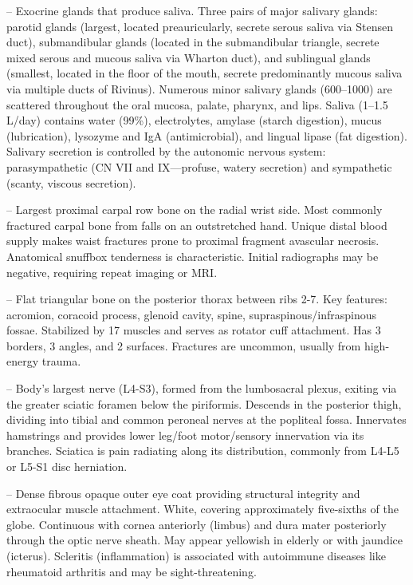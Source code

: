 -- Exocrine glands that produce saliva. Three pairs of major salivary glands: parotid glands (largest, located preauricularly, secrete serous saliva via Stensen duct), submandibular glands (located in the submandibular triangle, secrete mixed serous and mucous saliva via Wharton duct), and sublingual glands (smallest, located in the floor of the mouth, secrete predominantly mucous saliva via multiple ducts of Rivinus). Numerous minor salivary glands (600--1000) are scattered throughout the oral mucosa, palate, pharynx, and lips. Saliva (1--1.5 L/day) contains water (99\%), electrolytes, amylase (starch digestion), mucus (lubrication), lysozyme and IgA (antimicrobial), and lingual lipase (fat digestion). Salivary secretion is controlled by the autonomic nervous system: parasympathetic (CN VII and IX—profuse, watery secretion) and sympathetic (scanty, viscous secretion).

-- Largest proximal carpal row bone on the radial wrist side. Most commonly fractured carpal bone from falls on an outstretched hand. Unique distal blood supply makes waist fractures prone to proximal fragment avascular necrosis. Anatomical snuffbox tenderness is characteristic. Initial radiographs may be negative, requiring repeat imaging or MRI.

-- Flat triangular bone on the posterior thorax between ribs 2-7. Key features: acromion, coracoid process, glenoid cavity, spine, supraspinous/infraspinous fossae. Stabilized by 17 muscles and serves as rotator cuff attachment. Has 3 borders, 3 angles, and 2 surfaces. Fractures are uncommon, usually from high-energy trauma.

-- Body's largest nerve (L4-S3), formed from the lumbosacral plexus, exiting via the greater sciatic foramen below the piriformis. Descends in the posterior thigh, dividing into tibial and common peroneal nerves at the popliteal fossa. Innervates hamstrings and provides lower leg/foot motor/sensory innervation via its branches. Sciatica is pain radiating along its distribution, commonly from L4-L5 or L5-S1 disc herniation.

-- Dense fibrous opaque outer eye coat providing structural integrity and extraocular muscle attachment. White, covering approximately five-sixths of the globe. Continuous with cornea anteriorly (limbus) and dura mater posteriorly through the optic nerve sheath. May appear yellowish in elderly or with jaundice (icterus). Scleritis (inflammation) is associated with autoimmune diseases like rheumatoid arthritis and may be sight-threatening.

